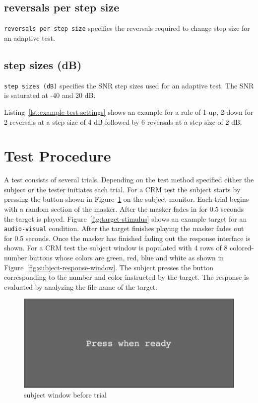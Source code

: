 \documentclass[11pt,pdftex,letterpaper]{article}
\begin{document}
\subsection{reversals per step size}
\texttt{reversals per step size} specifies the reversals required to change step size for an adaptive test.
\subsection{step sizes (dB)}
\texttt{step sizes (dB)} specifies the SNR step sizes used for an adaptive test. The SNR is saturated at -40 and 20 dB.

\vspace{\baselineskip}
Listing~\ref{lst:example-test-settings} shows an example for a rule of 1-up, 2-down for 2 reversals at a step size of 4 dB followed by 6 reversals at a step size of 2 dB.

\section{Test Procedure}
A test consists of several trials. Depending on the test method specified either the subject or the tester initiates each trial. For a CRM test the subject starts by pressing the button shown in Figure~\ref{fig:subject-ready-window} on the subject monitor. Each trial begins with a random section of the masker. After the masker fades in for 0.5 seconds the target is played. Figure~\ref{fig:target-stimulus} shows an example target for an \texttt{audio-visual} condition. After the target finishes playing the masker fades out for 0.5 seconds. Once the masker has finished fading out the response interface is shown. For a CRM test the subject window is populated with 4 rows of 8 colored-number buttons whose colors are green, red, blue and white as shown in Figure~\ref{fig:subject-response-window}. The subject presses the button corresponding to the number and color instructed by the target. The response is evaluated by analyzing the file name of the target.

\begin{figure}
\centering
\includegraphics[width = 0.9\linewidth]{subject-ready-window.png}
\caption{subject window before trial}
\label{fig:subject-ready-window}
\end{figure}
\end{document}
